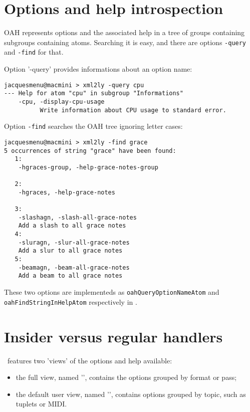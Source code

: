 {\begin{lstlisting}[language=CPlusPlus]
\end{lstlisting}


\section{Options and help introspection}

OAH represents options and the associated help in a tree of groups containing subgroups containing atoms. Searching it is easy, and there are options {\tt -query} and {\tt -find} for that.

Option '-query' provides informations about an option name:
\begin{lstlisting}[language=Terminal]
jacquesmenu@macmini > xml2ly -query cpu
--- Help for atom "cpu" in subgroup "Informations"
    -cpu, -display-cpu-usage
          Write information about CPU usage to standard error.
\end{lstlisting}

Option {\tt -find} searches the OAH tree ignoring letter cases:
\begin{lstlisting}[language=Terminal]
jacquesmenu@macmini > xml2ly -find grace
5 occurrences of string "grace" have been found:
   1:
    -hgraces-group, -help-grace-notes-group

   2:
    -hgraces, -help-grace-notes

   3:
    -slashagn, -slash-all-grace-notes
    Add a slash to all grace notes
   4:
    -sluragn, -slur-all-grace-notes
    Add a slur to all grace notes
   5:
    -beamagn, -beam-all-grace-notes
    Add a beam to all grace notes
\end{lstlisting}

These two options are implementeds as {\tt oahQueryOptionNameAtom} and {\tt oahFindStringInHelpAtom} respectively in .


\section{Insider versus regular handlers}

\mf\ features two 'views' of the options and help available:
\begin{itemize}
\item the full view, named '\insider', contains the options grouped by format or pass;
\item the default user view, named '\regular', contains options grouped by topic, such as tuplets or MIDI.
\end{itemize}

}
